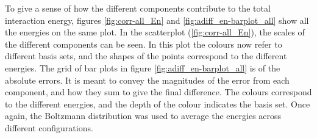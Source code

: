\begin{multicols}{2}

To give a sense of how the different components contribute to the total interaction energy, figures 
\ref{fig:corr-all_En} and
\ref{fig:adiff_en-barplot_all}
show all the energies on the same plot.
In the scatterplot (\ref{fig:corr-all_En}), the scales of the different components can be seen.
In this plot the colours now refer to different basis sets, and the shapes of the points correspond to the different energies.
The grid of bar plots in figure \ref{fig:adiff_en-barplot_all} is of the absolute errors.
It is meant to convey the magnitudes of the error from each component, and how they sum to give the final difference.
The colours correspond to the different energies, and the depth of the colour indicates the basis set.
Once again, the Boltzmann distribution was used to average the energies across different configurations.


\end{multicols}
